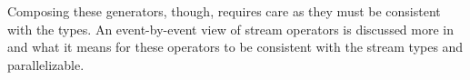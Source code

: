 Composing these generators, though, requires care as they must be consistent with the types. An event-by-event view of stream operators is discussed more in  and what it means for these operators to be consistent with the stream types and parallelizable.

